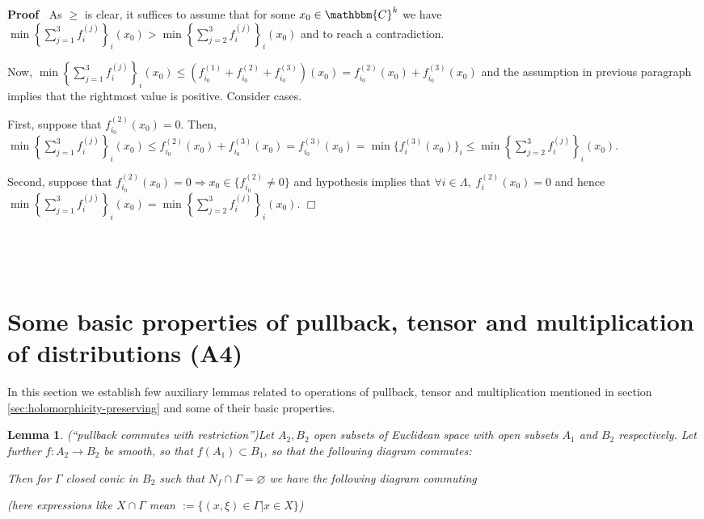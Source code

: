 \documentclass{article}
\newcommand{\assign}{:=}
\renewenvironment{proof}{\noindent\textbf{Proof\ }}{\hspace*{\fill}$\Box$\medskip}
\newtheorem{lemma}[proposition]{Lemma}
\theoremstyle{remark}
\newcommand{\C}{\ensuremath{\mathbbm{C}}}
\begin{document}
\begin{proof}
  As $\geqslant$ is clear, it suffices to assume that for some $x_0 \in
  \mathbbm{C}^k$ we have $\min \left\{ \sum_{j = 1}^3 f^{(j)}_i \right\}_i
  (x_0) > \min \left\{ \sum_{j = 2}^3 f^{(j)}_i \right\}_i (x_0)$ and to reach
  a contradiction.
  
  Now, $\min \left\{ \sum_{j = 1}^3 f^{(j)}_i \right\}_i (x_0) \leqslant
  (f_{i_0}^{(1)} + f_{i_0}^{(2)} + f_{i_0}^{(3)}) (x_0) = f_{i_0}^{(2)} (x_0)
  + f_{i_0}^{(3)} (x_0)$ and the assumption in previous paragraph implies that
  the rightmost value is positive. Consider cases.
  
  First, suppose that $f_{i_0}^{(2)} (x_0) = 0$. Then, $\min \left\{ \sum_{j =
  1}^3 f^{(j)}_i \right\}_i (x_0) \leqslant f_{i_0}^{(2)} (x_0) +
  f_{i_0}^{(3)} (x_0) = f^{(3)}_{i_0} (x_0) = \min \{ f^{(3)}_{i} (x_0)
  \}_i \leqslant \min \left\{ \sum_{j = 2}^3 f^{(j)}_i \right\}_i (x_0)$.
  
  Second, suppose that $f_{i_0}^{(2)} (x_0) = 0 \Rightarrow x_0 \in \{
  f_{i_0}^{(2)} \neq 0 \}$ and hypothesis implies that $\forall i \in \Lambda,
  \; f_i^{(2)} (x_0) = 0$ and hence $\min \left\{ \sum_{j = 1}^3 f^{(j)}_i
  \right\}_i (x_0) = \min \left\{ \sum_{j = 2}^3 f_i^{(j)} \right\}_i (x_0)$.
\end{proof}

\

\

\section{Some basic properties of pullback, tensor and multiplication of
distributions (A4)}\label{sec:pull-tensor-mult}

In this section we establish few auxiliary lemmas related to operations of
pullback, tensor and multiplication mentioned in section
\ref{sec:holomorphicity-preserving} and some of their basic properties.

\begin{lemma}
  \label{KR-normalization-recur:lem-pull-comm-restr}(``pullback commutes with
  restriction'')Let $A_2, B_2$ open subsets of Euclidean space with open
  subsets $A_1$ and $B_2$ respectively. Let further $f : A_2 \rightarrow B_2$
  be smooth, so that $f (A_1) \subset B_1$, so that the following diagram
  commutes:
  
  \centerline{ }%
  
  Then for $\Gamma$ closed conic in $B_2$ such that $N_f \cap \Gamma =
  \varnothing$ we have the following diagram commuting
  \centerline{ }%
  (here expressions like $X \cap \Gamma$ mean $\assign \{ (x, \xi) \in \Gamma
  | x \in X \}$)
\end{lemma}
\end{document}

